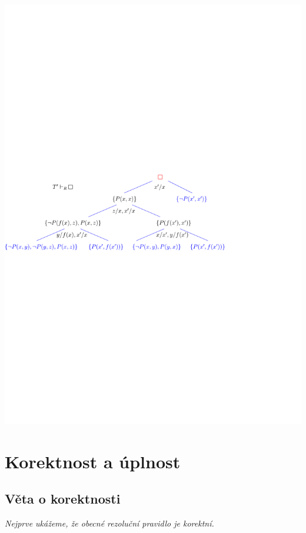    \vspace{-2mm}
    \centerline{\includegraphics[scale=0.8]{files/rezolucePLpriklad}}
    
    


\section{Korektnost a úplnost}\label{section:predicate-resolution-soundness-completeness}
\todo



\subsection{Věta o korektnosti}\todo

{\it Nejprve ukážeme, že obecné rezoluční pravidlo je korektní.}
\medskip

